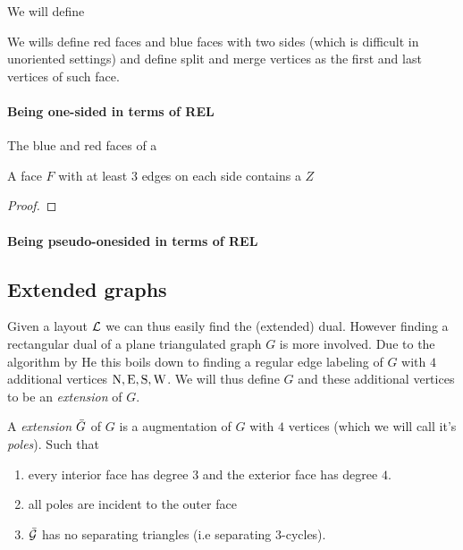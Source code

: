  We will define

  We wills define red faces and blue faces  with two sides (which is difficult in unoriented settings) and define split and merge vertices as the first and last vertices of such face.

  \paragraph{Being one-sided in terms of REL}
  The blue and red faces of a

  \begin{lemma}
  \label{lm:zInRedFace}
  A face $F$ with at least $3$ edges on each side contains a $Z$
  \end{lemma}
  \begin{proof}
  \end{proof}


  \paragraph{Being pseudo-onesided in terms of REL}



\subsection{Extended graphs}
  Given a layout $\mathcal{L}$ we can thus easily find the (extended) dual. However finding a rectangular dual of a plane triangulated graph $G$ is more involved. Due to the algorithm by He \cite{He} this boils down to finding a regular edge labeling of $G$ with $4$ additional vertices $\mathrm{N}, \mathrm{E}, \mathrm{S}, \mathrm{W}$. We will thus define $G$ and these additional vertices to be an \emph{extension} of $G$.

  \begin{defi}[Extension]
    A \emph{extension} $\bar{G}$ of $G$ is a augmentation of $G$ with $4$ vertices (which we will call it's \emph{poles}). Such that
    \begin{enumerate}
    \item every interior face has degree $3$ and the exterior face has degree $4$.
    \item all poles are incident to the outer face
    \item $\bar{\mathcal{G}}$ has no separating triangles (i.e separating $3$-cycles).
    \end{enumerate}
  \end{defi}

